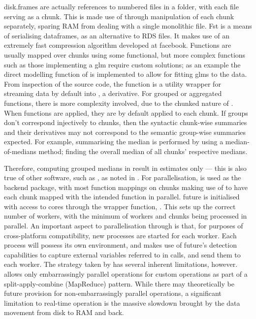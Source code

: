 disk.frames are actually references to numbered  files in a
folder, with each file serving as a chunk.
This is made use of through manipulation of each chunk separately, sparing RAM from dealing with a single monolithic file\cite{zj19:_inges_data}.
Fst is a means of serialising dataframes, as an alternative to RDS files\cite{klik19}.
It makes use of an extremely fast compression algorithm developed at facebook.
Functions are usually mapped over chunks using some functional, but more complex functions such as those implementing a glm require custom solutions; as an example the direct modelling function of  is implemented to allow for fitting glms to the data.
From inspection of the source code, the function is a utility wrapper for streaming  data by default into , a  derivative.
For grouped or aggregated functions, there is more complexity involved, due to the chunked nature of .
When functions are applied, they are by default applied to each chunk.
If groups don't correspond injectively to chunks, then the syntactic chunk-wise summaries and their derivatives may not correspond to the semantic group-wise summaries expected.
For example, summarising the median is performed by using a median-of-medians method; finding the overall median of all chunks' respective medians.

Therefore, computing grouped medians in  result in estimates only --- this is also true of other software, such as , as noted in \cite{zj19:_group_by}.
For parallelisation,  is used as the backend package, with most function mappings on chunks making use of  to have each chunk mapped with the intended function in parallel.
future is initialised with access to cores through the wrapper function,
\cite{zj19:_key}.
This sets up the correct number of workers, with the minimum of workers and chunks being processed in parallel.
An important aspect to parallelisation through  is that, for purposes of cross-platform compatibility, new \R{} processes are started for each worker\cite{zj19:_using}.
Each process will possess its own environment, and  makes use of future's detection capabilities to capture external variables referred to in calls, and send them to each worker.
The strategy taken by  has several inherent limitations, however.
 allows only embarrassingly
parallel operations for custom operations as part of a
split-apply-combine (MapReduce) pattern.
While there may theoretically be future provision for non-embarrassingly parallel operations, a significant limitation to real-time operation is the massive slowdown brought by the data movement from disk to RAM and back.

